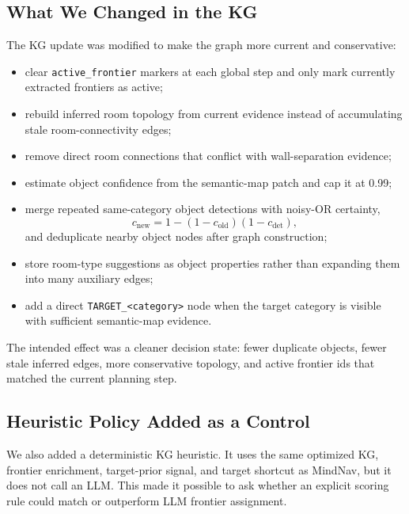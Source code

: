 \documentclass[11pt]{article}
\begin{document}
\subsection{What We Changed in the KG}

The KG update was modified to make the graph more current and conservative:
\begin{itemize}
    \item clear \texttt{active\_frontier} markers at each global step and only
    mark currently extracted frontiers as active;
    \item rebuild inferred room topology from current evidence instead of
    accumulating stale room-connectivity edges;
    \item remove direct room connections that conflict with wall-separation
    evidence;
    \item estimate object confidence from the semantic-map patch and cap it at
    0.99;
    \item merge repeated same-category object detections with noisy-OR
    certainty,
    \[
        c_{\mathrm{new}} = 1 - (1-c_{\mathrm{old}})(1-c_{\mathrm{det}}),
    \]
    and deduplicate nearby object nodes after graph construction;
    \item store room-type suggestions as object properties rather than
    expanding them into many auxiliary edges;
    \item add a direct \texttt{TARGET\_<category>} node when the target category
    is visible with sufficient semantic-map evidence.
\end{itemize}

The intended effect was a cleaner decision state: fewer duplicate objects, fewer
stale inferred edges, more conservative topology, and active frontier ids that
matched the current planning step.

\subsection{Heuristic Policy Added as a Control}

We also added a deterministic KG heuristic. It uses the same optimized KG,
frontier enrichment, target-prior signal, and target shortcut as MindNav, but it
does not call an LLM. This made it possible to ask whether an explicit scoring
rule could match or outperform LLM frontier assignment.
\end{document}

